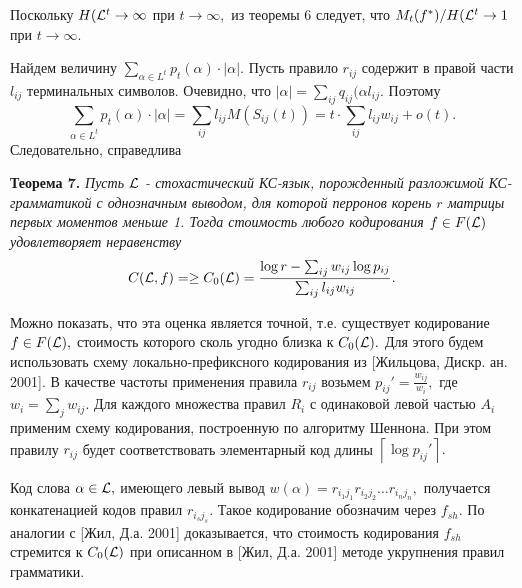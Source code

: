 \documentclass[12pt,russian]{article}
\begin{document}
{Поскольку  $H({\cal L}^t \rightarrow \infty$ при $t \rightarrow \infty,$ из теоремы 6 следует, что $M_t(f^*)/H({\cal L}^t \rightarrow 1$ при $t \rightarrow \infty.$ 

Найдем величину $\sum_{ \alpha \in L^t} p_t(\alpha) \cdot | \alpha|.$ Пусть правило $r_{ij}$ содержит в правой части $l_{ij}$ терминальных символов. Очевидно, что $\left|\alpha\right|=\sum_{ij} q_{ij}(\alpha l_{ij}.$ Поэтому 
$$
\sum_{ \alpha \in L^t} p_t(\alpha) \cdot | \alpha|=\sum_{ij} l_{ij} M(S_{ij}(t))= t\cdot \sum_{ij} l_{ij} w_{ij} +o(t).
$$
Следовательно, справедлива

\medskip

{\bf Теорема 7.} 
{\em 
Пусть ${\cal L}$ - стохастический КС-язык, порожденный разложимой КС-гра\-м\-ма\-ти\-кой
с однозначным выводом, для которой перронов корень $r$ матрицы первых моментов меньше 1. Тогда
стоимость любого кодирования $f \in F({\cal L})$ удовлетворяет неравенству
$$
C({\cal L},f)= \ge C_0({\cal L})= \frac {\log r-\sum_{ij} w_{ij}\log p_{ij}}{\sum_{ij} l_{ij} w_{ij}}.
$$
}

\medskip
Можно показать, что эта оценка является точной, т.е. существует кодирование $f \in F({\cal L}),$ стоимость которого сколь угодно близка к $C_0({\cal L}).$ Для этого будем использовать схему локально-префиксного кодирования из [Жильцова, Дискр. ан. 2001]. В качестве частоты применения правила $r_{ij}$ возьмем $p_{ij}'=\frac{w_{ij}}{w_i},$ где $w_i = \sum_{j} w_{ij}.$ Для каждого множества правил $R_i$ с одинаковой левой частью $A_i$ применим схему кодирования, построенную по алгоритму Шеннона. При этом правилу $r_{ij}$ будет соответствовать элементарный код длины $\left\lceil  \log p_{ij}'\right\rceil.$  

Код слова $\alpha \in {\cal L},$ имеющего левый вывод $w(\alpha)=r_{i_1 j_1} r_{i_2 j_2} \ldots r_{i_n j_n},$ получается конкатенацией кодов правил $r_{i_s j_s}.$ Такое кодирование обозначим через $f_{sh}.$
По аналогии с [Жил, Д.а. 2001] доказывается, что стоимость кодирования $f_{sh}$ стремится к $C_0({\cal L})$ при описанном в [Жил, Д.а. 2001] методе укрупнения правил грамматики.

}
\end{document}
